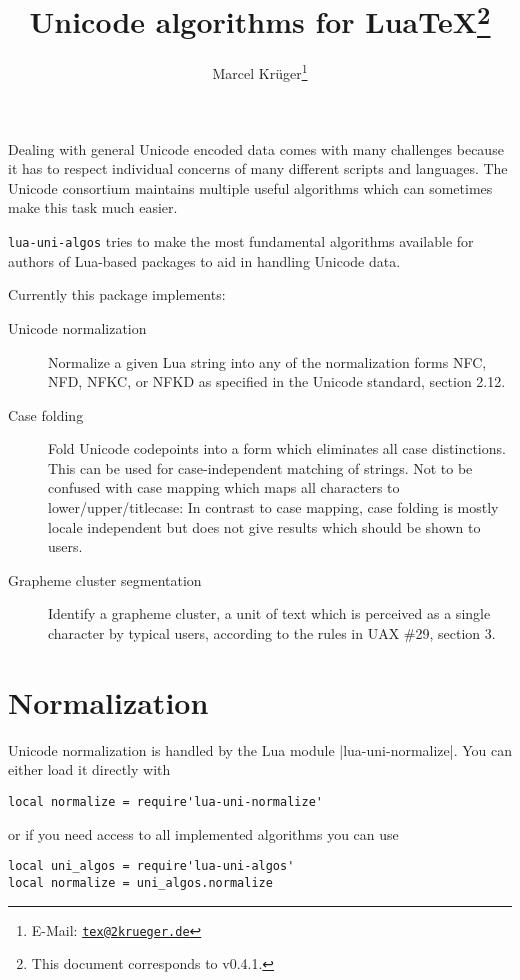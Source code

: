 \documentclass{article}
\title{Unicode algorithms for Lua\TeX\thanks{This document corresponds to \pkg{lua-uni-algos} v0.4.1.}}
\author{Marcel Krüger\thanks{E-Mail: \href{mailto:tex@2krueger.de}{\nolinkurl{tex@2krueger.de}}}}
\newcommand\pkg{\texttt}
\begin{document}
\maketitle
Dealing with general Unicode encoded data comes with many challenges because it has to respect individual concerns of many different scripts and languages. The Unicode consortium maintains multiple useful algorithms which can sometimes make this task much easier.

\pkg{lua-uni-algos} tries to make the most fundamental algorithms available for authors of Lua-based packages to aid in handling Unicode data.

Currently this package implements:
\begin{description}
  \item[Unicode normalization] Normalize a given Lua string into any of the normalization forms NFC, NFD, NFKC, or NFKD as specified in the Unicode standard, section 2.12.
  \item[Case folding] Fold Unicode codepoints into a form which eliminates all case distinctions. This can be used for case-independent matching of strings. Not to be confused with case mapping which maps all characters to lower/upper/titlecase: In contrast to case mapping, case folding is mostly locale independent but does not give results which should be shown to users.
  \item[Grapheme cluster segmentation] Identify a grapheme cluster, a unit of text which is perceived as a single character by typical users, according to the rules in UAX \#29, section 3.
\end{description}
\section{Normalization}
Unicode normalization is handled by the Lua module |lua-uni-normalize|.
You can either load it directly with
\begin{verbatim}
local normalize = require'lua-uni-normalize'
\end{verbatim}
or if you need access to all implemented algorithms you can use
\begin{verbatim}
local uni_algos = require'lua-uni-algos'
local normalize = uni_algos.normalize
\end{verbatim}
\end{document}
